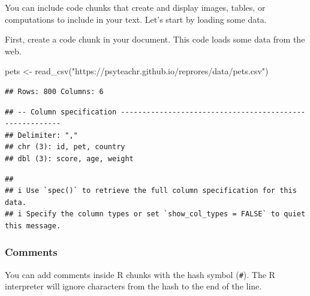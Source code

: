 \documentclass[
  oneside]{book}
\newenvironment{Shaded}{\begin{snugshade}}{\end{snugshade}}
\newcommand{\CommentTok}[1]{\textcolor[rgb]{0.56,0.35,0.01}{\textit{#1}}}
\newcommand{\FunctionTok}[1]{\textcolor[rgb]{0.00,0.00,0.00}{#1}}
\newcommand{\NormalTok}[1]{#1}
\newcommand{\OtherTok}[1]{\textcolor[rgb]{0.56,0.35,0.01}{#1}}
\newcommand{\SpecialCharTok}[1]{\textcolor[rgb]{0.00,0.00,0.00}{#1}}
\newcommand{\StringTok}[1]{\textcolor[rgb]{0.31,0.60,0.02}{#1}}
\begin{document}
You can include code chunks that create and display images, tables, or computations to include in your text. Let's start by loading some data.

First, create a code chunk in your document. This code loads some data from the web.

\begin{Shaded}
\begin{Highlighting}[]
\NormalTok{pets }\OtherTok{\textless{}{-}} \FunctionTok{read\_csv}\NormalTok{(}\StringTok{"https://psyteachr.github.io/reprores/data/pets.csv"}\NormalTok{)}
\end{Highlighting}
\end{Shaded}

\begin{verbatim}
## Rows: 800 Columns: 6
\end{verbatim}

\begin{verbatim}
## -- Column specification --------------------------------------------------------
## Delimiter: ","
## chr (3): id, pet, country
## dbl (3): score, age, weight
\end{verbatim}

\begin{verbatim}
## 
## i Use `spec()` to retrieve the full column specification for this data.
## i Specify the column types or set `show_col_types = FALSE` to quiet this message.
\end{verbatim}

\hypertarget{comments}{%
\subsubsection{Comments}\label{comments}}

You can add comments inside R chunks with the hash symbol (\texttt{\#}). The R interpreter will ignore characters from the hash to the end of the line.

\begin{Shaded}
\end{Shaded}
\end{document}
